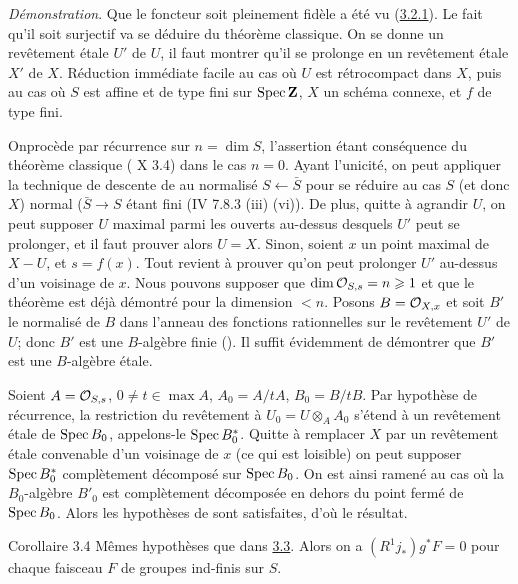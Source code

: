 \documentclass[10pt]{../fichiers-configuration-latex/smfart}
\begin{document}
\noindent
\emph{Démonstration}. Que le foncteur soit pleinement fidèle a été vu
(\hyperref[XVI.cor3.2.1]{3.2.1}). Le fait qu'il soit  surjectif va se déduire du théorème
classique. On se donne un revêtement étale $U'$ de $U$, il faut
montrer qu'il se prolonge en un revêtement étale $X'$ de
$X$. Réduction immédiate facile au cas où $U$ est rétrocompact dans
$X$, puis au cas où $S$ est affine et de type fini sur $\operatorname{Spec}
\mathbf{Z}$, $X$ un schéma connexe, et $f$ de type fini.

On\pageoriginale procède par récurrence sur $n=\dim S$, l'assertion
étant conséquence du théorème classique ( X 3.4) dans le cas
$n=0$. Ayant l'unicité, on peut appliquer la technique de descente de
 au normalisé $S\leftarrow \bar{S}$ pour se réduire au cas
$S$ (et donc $X$) normal ($\bar{S}\rightarrow S$ étant fini (\EGA IV
7.8.3 (iii) (vi)). De plus, quitte à agrandir $U$, on peut supposer
$U$ maximal parmi les ouverts au-dessus desquels $U'$ peut se
prolonger, et il faut prouver alors $U=X$. Sinon, soient $x$ un point
maximal de $X-U$, et $s=f(x)$. Tout revient à prouver qu'on peut
prolonger $U'$ au-dessus d'un voisinage de $x$. Nous pouvons supposer
que $\dim {\mathcal O}_{S,s}=n\geqslant 1$ et que le théorème est déjà démontré pour
la dimension $<n$. Posons $B={\mathcal O}_{X,x}$ et soit $B'$ le normalisé de $B$
dans l'anneau des fonctions rationnelles sur le revêtement $U'$ de
$U$; donc $B'$ est une $B$-algèbre finie (\loccit). Il suffit
évidemment de démontrer que $B'$ est une $B$-algèbre étale.

Soient $A={\mathcal O}_{S,s}$, $0\neq t\in \max A$, $A_{0}=A/tA$,
$B_{0}=B/tB$. Par hypothèse de récurrence, la restriction du
revêtement à $U_{0}=U\otimes_A A_{0}$ s'étend à un revêtement
étale de $\operatorname{Spec} B_{0}$, appelons-le $\operatorname{Spec}
B^{\ast}_{0}$. Quitte à remplacer $X$ par un revêtement étale
convenable d'un voisinage de $x$ (ce qui est loisible) on peut
supposer $\operatorname{Spec} B^{\ast}_{0}$ complètement décomposé sur $\operatorname{Spec}
B_{0}$. On est ainsi ramené au cas où la $B_{0}$-algèbre
$B'_{0}$ est complètement décomposée en dehors du point fermé de
$\operatorname{Spec} B_{0}$. Alors les hypothèses de  sont satisfaites,
d'où le résultat.

\begin{enonce*}{Corollaire 3.4}
Mêmes hypothèses que dans \hyperref[XVI.thm3.3]{3.3}. Alors on a
$(R^{1}j_{\ast})g^{\ast}F=0$ pour chaque faisceau $F$ de groupes
ind-finis sur $S$.
\end{enonce*}
\end{document}

